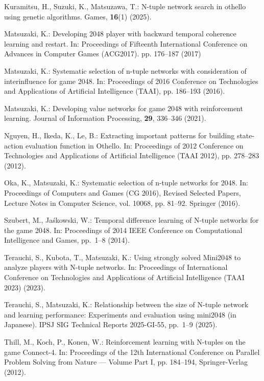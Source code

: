 \begin{thebibliography}{10}
Kuramitsu, H., Suzuki, K., Matsuzawa, T.: N-tuple network search in othello
  using genetic algorithms. Games, \textbf{16}(1) (2025).

Matsuzaki, K.: Developing 2048 player with backward temporal coherence learning
  and restart. In: Proceedings of Fifteenth International Conference on
  Advances in Computer Games (ACG2017). pp. 176--187 (2017)

Matsuzaki, K.: Systematic selection of n-tuple networks with consideration of
  interinfluence for game 2048. In: Proceedings of 2016 Conference on Technologies and
  Applications of Artificial Intelligence (TAAI), pp. 186--193 (2016).

Matsuzaki, K.: Developing value networks for game 2048 with reinforcement
  learning. Journal of Information Processing, \textbf{29},  336--346 (2021).

Nguyen, H., Ikeda, K., Le, B.: Extracting important patterns for building
  state-action evaluation function in {Othello}. In: Proceedings of 2012 Conference on
  Technologies and Applications of Artificial Intelligence (TAAI 2012), pp. 278--283 (2012).

Oka, K., Matsuzaki, K.: Systematic selection of n-tuple networks for 2048. In: Proceedings of
Computers and Games ({CG} 2016), Revised Selected Papers, Lecture Notes in Computer Science,
  vol. 10068, pp. 81--92. Springer (2016).

Szubert, M., Ja\'{s}kowski, W.: Temporal difference learning of {N}-tuple
  networks for the game 2048. In: Proceedings of 2014 IEEE Conference on Computational
  Intelligence and Games, pp.~1--8 (2014).

Terauchi, S., Kubota, T., Matsuzaki, K.: Using strongly solved {Mini2048} to
  analyze players with {N-tuple} networks. In: Proceedings of International Conference on
  Technologies and Applications of Artificial Intelligence ({TAAI} 2023) (2023).

Terauchi, S., Matsuzaki, K.: Relationship between the size of {N}-tuple network
  and learning performance: Experiments and evaluation using mini2048 (in
  Japanese). IPSJ SIG Technical Reports {2025-GI-55}, pp.~1--9 (2025).

Thill, M., Koch, P., Konen, W.: Reinforcement learning with {N}-tuples on the
  game {Connect-4}. In: Proceedings of the 12th International Conference on
  Parallel Problem Solving from Nature --- Volume Part I, pp. 184--194,
  Springer-Verlag (2012).


\end{thebibliography}
